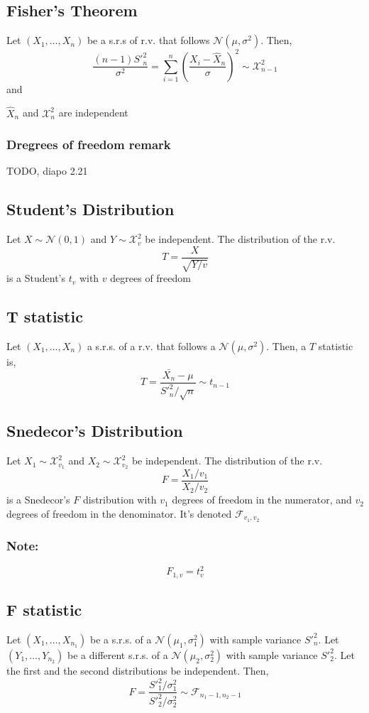 \subsection{Fisher's Theorem}
Let $(X_1,\dots,X_n)$ be a s.r.s of r.v. that follows $\mathcal{N}(\mu,\sigma^2)$. Then,
\[ \frac{(n-1)S'^2_n}{\sigma^2} = \sum_{i=1}^{n} (\frac{X_i - \hat{X}_n}{\sigma})^2 \sim \mathcal{X}_{n-1}^2 \]
and
\begin{center}
    $\hat{X}_n$ and $\mathcal{X}_n^2$ are independent
\end{center}

\subsubsection{Dregrees of freedom remark}
TODO, diapo 2.21

\subsection{Student's Distribution}
Let $X \sim \mathcal{N}(0,1)$ and $Y \sim \mathcal{X}_v^2$ be independent. The distribution of the r.v. 
\[ T = \frac{X}{\sqrt{Y/v}} \]
is a Student's $t_v$ with $v$ degrees of freedom

\subsection{T statistic}
Let $(X_1,\dots,X_n)$ a s.r.s. of a r.v. that follows a $\mathcal{N}(\mu,\sigma^2)$. Then, a $T$ statistic is,
\[ T = \frac{\bar{X_n}-\mu}{S'^2_n / \sqrt{n}} \sim t_{n-1}\]

\subsection{Snedecor's Distribution}
Let $X_1 \sim \mathcal{X}_{v_1}^2$ and $X_2 \sim \mathcal{X}_{v_2}^2$ be independent. The distribution of the r.v.
\[ F = \frac{X_1/v_1}{X_2/v_2} \]
is a Snedecor's $F$ distribution with $v_1$ degrees of freedom in the numerator, and $v_2$ degrees of freedom in the denominator. It's denoted $\mathcal{F}_{v_1,v_2}$

\subsubsection{Note:}
\[ F_{1,v} = t^2_v \]

\subsection{F statistic}
Let $(X_1,\dots,X_{n_1})$ be a s.r.s. of a $\mathcal{N}(\mu_1,\sigma^2_1)$ with sample variance $S'^2_n$. Let $(Y_1,\dots,Y_{n_2})$ be a different s.r.s. of a 
$\mathcal{N}(\mu_2,\sigma^2_2)$ with sample variance $S'^2_2$. Let the first and the second distributions be independent. Then,
\[ F = \frac{S'^2_1/\sigma^2_1}{S'^2_2/\sigma^2_2} \sim \mathcal{F}_{n_1-1,n_2-1}\]

